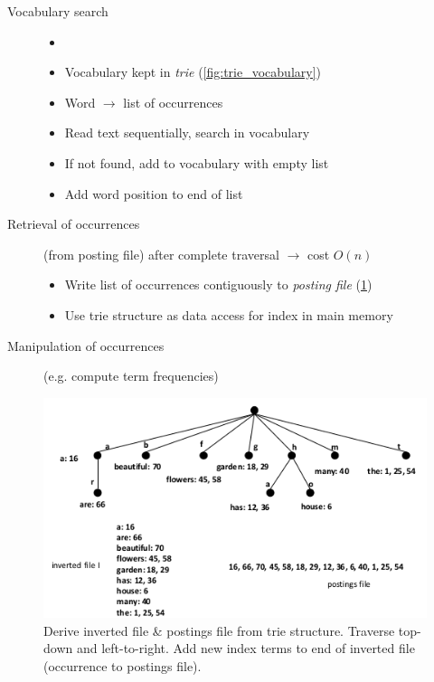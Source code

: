 \begin{description}

  \item[Vocabulary search]
  \begin{itemize}
    \item[]
    \item Vocabulary kept in \emph{trie} (\cref{fig:trie_vocabulary})
    \item Word $\longrightarrow$ list of occurrences
    \item Read text sequentially, search in vocabulary
    \item If not found, add to vocabulary with empty list
    \item Add word position to end of list
  \end{itemize}

  \item[Retrieval of occurrences] (from posting file) after complete traversal $\rightarrow$ cost $O(n)$
  \begin{itemize}
    \item Write list of occurrences contiguously to \emph{posting file} (\cref{fig:trie_to_postings})
    \item Use trie structure as data access for index in main memory
  \end{itemize}

  \item[Manipulation of occurrences] (e.g. compute term frequencies)

\end{description}

\begin{figure}
  \centering
  \includegraphics[width=\linewidth]{figures/trie_to_postings.png}
  \caption{Derive inverted file \& postings file from trie structure. Traverse top-down and left-to-right. Add new index terms to end of inverted file (occurrence to postings file).}
  \label{fig:trie_to_postings}
\end{figure}
